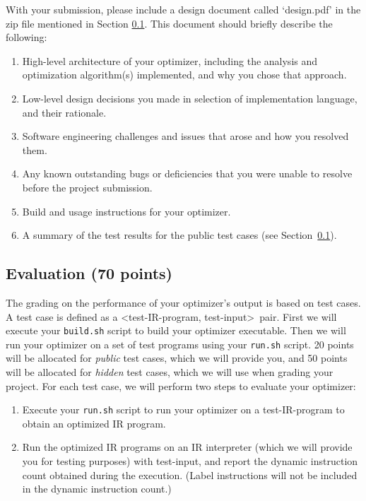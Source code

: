 \documentclass[12pt]{article}
\begin{document}
With your submission, please include a design document called
`design.pdf' in the zip file mentioned in Section \ref{sec:test}.
%
This document should briefly describe the following:
%
\begin{enumerate}
\item High-level architecture of your optimizer, including the
  analysis and optimization
  algorithm(s) implemented, and why you chose that approach.
\item Low-level design decisions you made in selection of
  implementation language, and their rationale.
\item Software engineering challenges and issues that arose and how
  you resolved them.
\item Any known outstanding bugs or deficiencies that you were unable
  to   resolve before the project submission.
       \item Build and usage instructions for your optimizer.
        \item A summary of the test results for the public test cases
          (see Section~\ref{sec:test}).
 \end{enumerate}
   
\subsection{Evaluation (70 points)}\label{sec:test}

The grading on the performance of your optimizer's output is based on test cases.
A test case is defined as a \textless test-IR-program, test-input\textgreater~pair.
First we will execute your \texttt{build.sh} script to build your optimizer executable.
Then we will run your optimizer on a set of test programs using your \texttt{run.sh} script.  20 points will
be allocated for {\em public} test cases, which we will provide you, and 50
points will be allocated for {\em hidden} test cases, which we will
use when grading your project.  For each test case, we will perform
two steps to evaluate your optimizer:
\begin{enumerate}
\item Execute your  \texttt{run.sh} script to run your optimizer on a test-IR-program to obtain an optimized IR program.
\item Run the optimized IR programs on an IR interpreter (which we will
  provide you for testing purposes) with test-input, and report the
  dynamic instruction count obtained during the execution.  (Label
  instructions will not be included in the dynamic instruction count.)
\end{enumerate}
\end{document}
